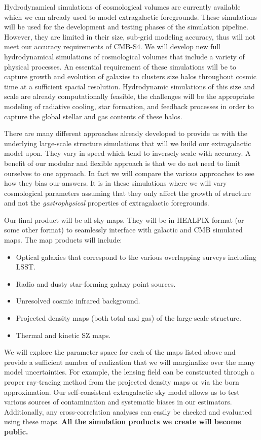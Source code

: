Hydrodynamical simulations of cosmological volumes are currently available which we can already used to model extragalactic foregrounds. These simulations will be used for the development and testing phases of the simulation pipeline. However, they are limited in their size, sub-grid modeling accuracy, thus will not meet our accuracy requirements of CMB-S4. We will develop new full hydrodynamical simulations of cosmological volumes that include a variety of physical processes. An essential requirement of these simulations will be to capture growth and evolution of galaxies to clusters size halos throughout cosmic time at a sufficient spacial resolution. Hydrodynamic simulations of this size and scale are already computationally feasible, the challenges will be the appropriate modeling of radiative cooling, star formation, and feedback processes in order to capture the global stellar and gas contents of these halos.

There are many different approaches already developed to provide us with the underlying large-scale structure simulations that will we build our extragalactic model upon. They vary in speed which tend to inversely scale with accuracy. A benefit of our modular and flexible approach is that we do not need to limit ourselves to one approach. In fact we will compare the various approaches to see how they bias our answers. It is in these simulations where we will vary cosmological parameters assuming that they only affect the growth of structure and not the {\it gastrophysical} properties of extragalactic foregrounds.

Our final product will be all sky maps. They will be in HEALPIX format (or some other format) to seamlessly interface with galactic and CMB simulated maps. The map products will include:

\begin{itemize}
\item Optical galaxies that correspond to the various overlapping surveys including LSST.
\item Radio and dusty star-forming galaxy point sources.
\item Unresolved cosmic infrared background.
\item Projected density maps (both total and gas) of the large-scale structure.
\item Thermal and kinetic SZ maps.
\end{itemize}

\noindent We will explore the parameter space for each of the maps listed above and provide a sufficient number of realization that we will marginalize over the many model uncertainties. For example, the lensing field can be constructed through a proper ray-tracing method from the projected density maps or via the born approximation. Our self-consistent extragalactic sky model allows us to test various sources of contamination and systematic biases in our estimators. Additionally, any cross-correlation analyses can easily be checked and evaluated using these maps. {\bf All the simulation products we create will become public.}

%



